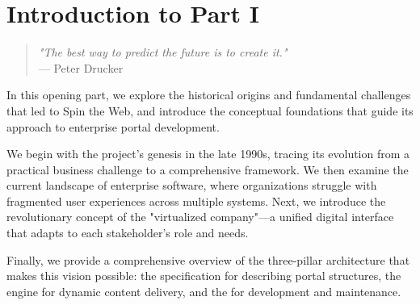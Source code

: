 
\chapter*{Introduction to Part I}
\label{part:foundations}

\begin{quote}
\textit{"The best way to predict the future is to create it."} \\
— Peter Drucker
\end{quote}

In this opening part, we explore the historical origins and fundamental challenges that led to Spin the Web, and introduce the conceptual foundations that guide its approach to enterprise portal development.

We begin with the project's genesis in the late 1990s, tracing its evolution from a practical business challenge to a comprehensive framework. We then examine the current landscape of enterprise software, where organizations struggle with fragmented user experiences across multiple systems. Next, we introduce the revolutionary concept of the "virtualized company"—a unified digital interface that adapts to each stakeholder's role and needs.

Finally, we provide a comprehensive overview of the three-pillar architecture that makes this vision possible: the \wbdl{} specification for describing portal structures, the \webspinner{} engine for dynamic content delivery, and the \studio{} for development and maintenance.

